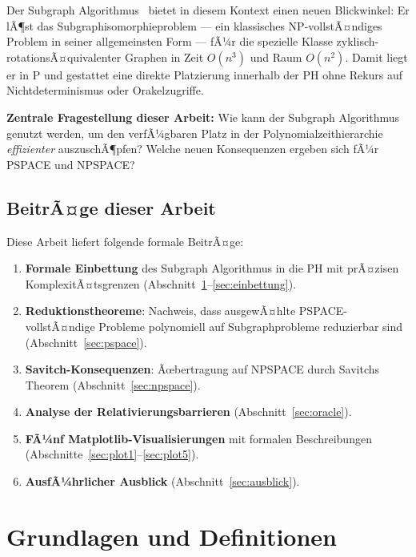 ﻿\documentclass[a4paper,12pt]{article}
\theoremstyle{definition}
\begin{document}
Der Subgraph Algorithmus~\cite{epp2026subgraph} bietet in diesem Kontext einen neuen Blickwinkel:
Er lÃ¶st das Subgraphisomorphieproblem --- ein klassisches NP-vollstÃ¤ndiges Problem
in seiner allgemeinsten Form --- fÃ¼r die spezielle Klasse zyklisch-rotationsÃ¤quivalenter
Graphen in Zeit $O(n^3)$ und Raum $O(n^2)$.
Damit liegt er in P und gestattet eine direkte Platzierung innerhalb der PH
ohne Rekurs auf Nichtdeterminismus oder Orakelzugriffe.

\textbf{Zentrale Fragestellung dieser Arbeit:}
Wie kann der Subgraph Algorithmus genutzt werden, um den verfÃ¼gbaren
Platz in der Polynomialzeithierarchie \emph{effizienter} auszuschÃ¶pfen?
Welche neuen Konsequenzen ergeben sich fÃ¼r PSPACE und NPSPACE?

\subsection{BeitrÃ¤ge dieser Arbeit}

Diese Arbeit liefert folgende formale BeitrÃ¤ge:

\begin{enumerate}
  \item \textbf{Formale Einbettung} des Subgraph Algorithmus in die PH mit prÃ¤zisen
        KomplexitÃ¤tsgrenzen (Abschnitt~\ref{sec:grundlagen}--\ref{sec:einbettung}).
  \item \textbf{Reduktionstheoreme}: Nachweis, dass ausgewÃ¤hlte PSPACE-vollstÃ¤ndige
        Probleme polynomiell auf Subgraphprobleme reduzierbar sind
        (Abschnitt~\ref{sec:pspace}).
  \item \textbf{Savitch-Konsequenzen}: Ãœbertragung auf NPSPACE durch
        Savitchs Theorem (Abschnitt~\ref{sec:npspace}).
  \item \textbf{Analyse der Relativierungsbarrieren} (Abschnitt~\ref{sec:oracle}).
  \item \textbf{FÃ¼nf Matplotlib-Visualisierungen} mit formalen Beschreibungen
        (Abschnitte~\ref{sec:plot1}--\ref{sec:plot5}).
  \item \textbf{AusfÃ¼hrlicher Ausblick} (Abschnitt~\ref{sec:ausblick}).
\end{enumerate}

\section{Grundlagen und Definitionen}
\label{sec:grundlagen}
\end{document}
